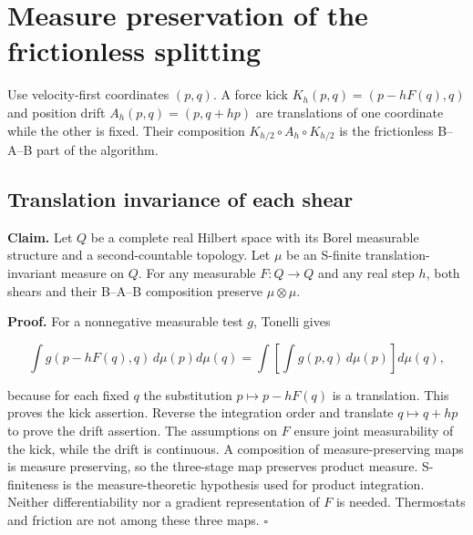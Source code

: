 \documentclass[11pt,a4paper]{report}
\begin{document}
\section{\texorpdfstring{Measure preservation of the frictionless splitting}{Measure preservation of the frictionless splitting}}


Use velocity-first coordinates \((p,q)\). A force kick \(K_h(p,q)=(p-hF(q),q)\) and position drift \(A_h(p,q)=(p,q+hp)\) are translations of one coordinate while the other is fixed. Their composition \(K_{h/2}\circ A_h\circ K_{h/2}\) is the frictionless B–A–B part of the algorithm.

\subsection{\texorpdfstring{Translation invariance of each shear}{Translation invariance of each shear}}


\textbf{Claim.} Let \(Q\) be a complete real Hilbert space with its Borel measurable structure and a second-countable topology. Let \(\mu\) be an S-finite translation-invariant measure on \(Q\). For any measurable \(F:Q\to Q\) and any real step \(h\), both shears and their B–A–B composition preserve \(\mu\otimes\mu\).



\textbf{Proof.} For a nonnegative measurable test \(g\), Tonelli gives

\[\int g(p-hF(q),q)\,d\mu(p)d\mu(q)=\int\left[\int g(p,q)\,d\mu(p)\right]d\mu(q),\]

because for each fixed \(q\) the substitution \(p\mapsto p-hF(q)\) is a translation. This proves the kick assertion. Reverse the integration order and translate \(q\mapsto q+hp\) to prove the drift assertion. The assumptions on \(F\) ensure joint measurability of the kick, while the drift is continuous. A composition of measure-preserving maps is measure preserving, so the three-stage map preserves product measure. S-finiteness is the measure-theoretic hypothesis used for product integration. Neither differentiability nor a gradient representation of \(F\) is needed. Thermostats and friction are not among these three maps. \(\square\)
\end{document}
